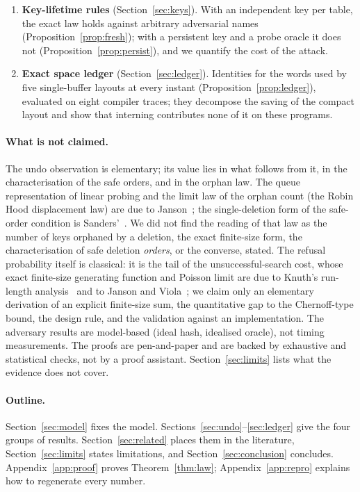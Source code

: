 \documentclass[11pt,a4paper]{article}
\theoremstyle{definition}
\theoremstyle{remark}
\begin{document}
\begin{enumerate}[leftmargin=*,label=\textbf{C\arabic*.}]
\item \textbf{Key-lifetime rules} (Section~\ref{sec:keys}). With an independent key per table, the exact law holds against arbitrary adversarial names (Proposition~\ref{prop:fresh}); with a persistent key and a probe oracle it does not (Proposition~\ref{prop:persist}), and we quantify the cost of the attack.
\item \textbf{Exact space ledger} (Section~\ref{sec:ledger}). Identities for the words used by five single-buffer layouts at every instant (Proposition~\ref{prop:ledger}), evaluated on eight compiler traces; they decompose the saving of the compact layout and show that interning contributes none of it on these programs.
\end{enumerate}

\paragraph{What is not claimed.} The undo observation is elementary; its value lies in what follows from it, in the characterisation of the safe orders, and in the orphan law. The queue representation of linear probing and the limit law of the orphan count (the Robin Hood displacement law) are due to Janson~\cite{janson2005}; the single-deletion form of the safe-order condition is Sanders'~\cite{sanders2018}. We did not find the reading of that law as the number of keys orphaned by a deletion, the exact finite-size form, the characterisation of safe deletion \emph{orders}, or the converse, stated. The refusal probability itself is classical: it is the tail of the unsuccessful-search cost, whose exact finite-size generating function and Poisson limit are due to Knuth's run-length analysis~\cite{knuth3} and to Janson and Viola~\cite{janson2016}; we claim only an elementary derivation of an explicit finite-size sum, the quantitative gap to the Chernoff-type bound, the design rule, and the validation against an implementation. The adversary results are model-based (ideal hash, idealised oracle), not timing measurements. The proofs are pen-and-paper and are backed by exhaustive and statistical checks, not by a proof assistant. Section~\ref{sec:limits} lists what the evidence does not cover.

\paragraph{Outline.} Section~\ref{sec:model} fixes the model. Sections~\ref{sec:undo}--\ref{sec:ledger} give the four groups of results. Section~\ref{sec:related} places them in the literature, Section~\ref{sec:limits} states limitations, and Section~\ref{sec:conclusion} concludes. Appendix~\ref{app:proof} proves Theorem~\ref{thm:law}; Appendix~\ref{app:repro} explains how to regenerate every number.
\end{document}
